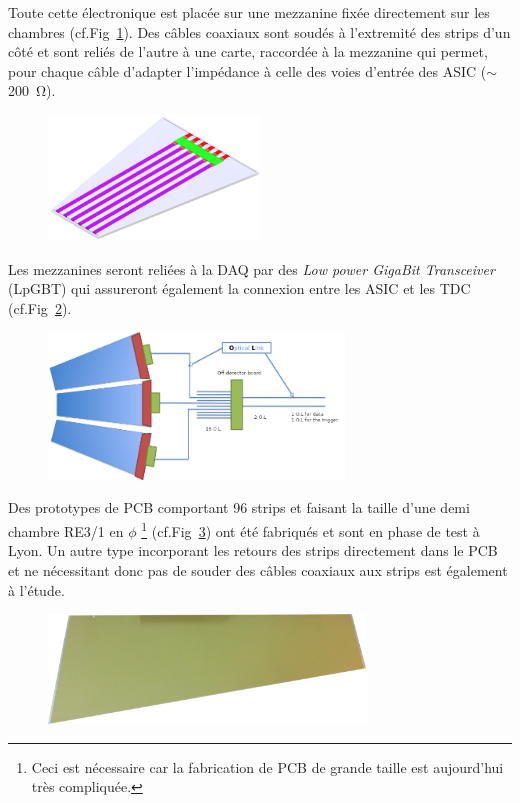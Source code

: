 Toute cette électronique est placée sur une mezzanine fixée directement sur les chambres (cf.Fig~\ref{chamber}). Des câbles coaxiaux sont soudés à l'extremité des strips d'un côté et sont reliés de l'autre à une carte, raccordée à la mezzanine qui permet, pour chaque câble d'adapter l'impédance à celle des voies d'entrée des ASIC ($\sim$\SI{200}{\ohm}).  

\begin{figure}[ht!]
	\centering
	\includegraphics[width=0.50\textwidth]{CON/chambre.png}
	\label{chamber}
\end{figure}

Les mezzanines seront reliées à la DAQ par des \textit{Low power GigaBit Transceiver} (LpGBT) qui assureront également la connexion entre les ASIC et les TDC (cf.Fig~\ref{chambres}). 

\begin{figure}[ht!]
	\centering
	\includegraphics[width=0.70\textwidth]{CON/chambres.png}
	\label{chambres}
\end{figure}

Des prototypes de PCB comportant \num{96} strips et faisant la taille d'une demi chambre RE3/1 en $\phi$ \footnote{Ceci est nécessaire car la fabrication de PCB de grande taille est aujourd'hui très compliquée.} (cf.Fig~\ref{proto}) ont été fabriqués et sont en phase de test à Lyon. Un autre type incorporant les retours des strips directement dans le PCB et ne nécessitant donc pas de souder des câbles coaxiaux aux strips est également à l'étude.

\begin{figure}[ht!]
	\centering
	\includegraphics[width=0.75\textwidth]{CON/proto.png}
	\label{proto}
\end{figure}